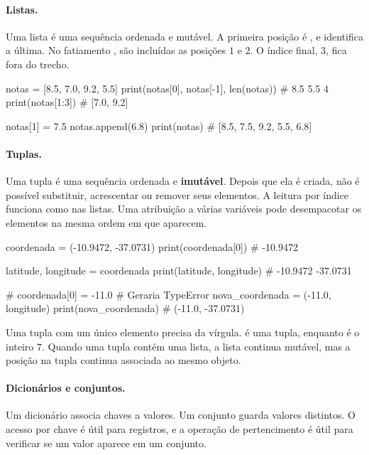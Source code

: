 \paragraph{Listas.}
Uma lista é uma sequência ordenada e mutável. A primeira posição é , e  identifica a última. No fatiamento , são incluídas as posições \(1\) e \(2\). O índice final, \(3\), fica fora do trecho.

\begin{exemplo}
notas = [8.5, 7.0, 9.2, 5.5]
print(notas[0], notas[-1], len(notas))  # 8.5 5.5 4
print(notas[1:3])                     # [7.0, 9.2]

notas[1] = 7.5
notas.append(6.8)
print(notas)                         # [8.5, 7.5, 9.2, 5.5, 6.8]
\end{exemplo}

\paragraph{Tuplas.}
Uma tupla é uma sequência ordenada e \textbf{imutável}. Depois que ela é criada, não é possível substituir, acrescentar ou remover seus elementos. A leitura por índice funciona como nas listas. Uma atribuição a várias variáveis pode desempacotar os elementos na mesma ordem em que aparecem.

\begin{exemplo}
coordenada = (-10.9472, -37.0731)
print(coordenada[0])  # -10.9472

latitude, longitude = coordenada
print(latitude, longitude)  # -10.9472 -37.0731

# coordenada[0] = -11.0  # Geraria TypeError
nova_coordenada = (-11.0, longitude)
print(nova_coordenada)  # (-11.0, -37.0731)
\end{exemplo}

Uma tupla com um único elemento precisa da vírgula.  é uma tupla, enquanto  é o inteiro \(7\). Quando uma tupla contém uma lista, a lista continua mutável, mas a posição na tupla continua associada ao mesmo objeto.

\paragraph{Dicionários e conjuntos.}
Um dicionário associa chaves a valores. Um conjunto guarda valores distintos. O acesso por chave é útil para registros, e a operação de pertencimento é útil para verificar se um valor aparece em um conjunto.

